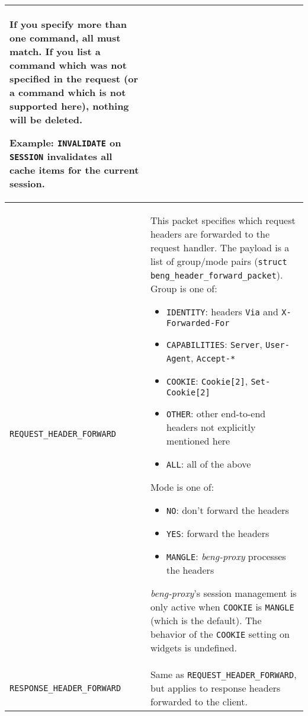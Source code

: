 \documentclass[a4paper,12pt]{article}
\begin{document}
\begin{longtable}{|l|p{8cm}|}
If you specify more than one command, all must match.  If you list a
command which was not specified in the request (or a command which is
not supported here), nothing will be deleted.

Example: \texttt{INVALIDATE} on \texttt{SESSION} invalidates all cache
items for the current session.

\\

\hline

\label{tfwdheader}
\texttt{REQUEST\_HEADER\_FORWARD} &

This packet specifies which request headers are forwarded to the
request handler.  The payload is a list of group/mode pairs
(\texttt{struct beng\_header\_forward\_packet}).  Group is one of:

\begin{itemize}
\item \texttt{IDENTITY}: headers \texttt{Via} and
  \texttt{X-Forwarded-For}
\item \texttt{CAPABILITIES}: \texttt{Server}, \texttt{User-Agent},
  \texttt{Accept-*}
\item \texttt{COOKIE}: \texttt{Cookie[2]}, \texttt{Set-Cookie[2]}
\item \texttt{OTHER}: other end-to-end headers not explicitly
  mentioned here
\item \texttt{ALL}: all of the above
\end{itemize}

Mode is one of:

\begin{itemize}
\item \texttt{NO}: don't forward the headers
\item \texttt{YES}: forward the headers
\item \texttt{MANGLE}: \emph{beng-proxy} processes the headers
\end{itemize}

\emph{beng-proxy}'s session management is only active when
\texttt{COOKIE} is \texttt{MANGLE} (which is the default).  The
behavior of the \texttt{COOKIE} setting on widgets is undefined.

\\

\hline

\texttt{RESPONSE\_HEADER\_FORWARD} &

Same as \texttt{REQUEST\_HEADER\_FORWARD}, but applies to response
headers forwarded to the client. \\

\hline
\end{longtable}
\end{document}
